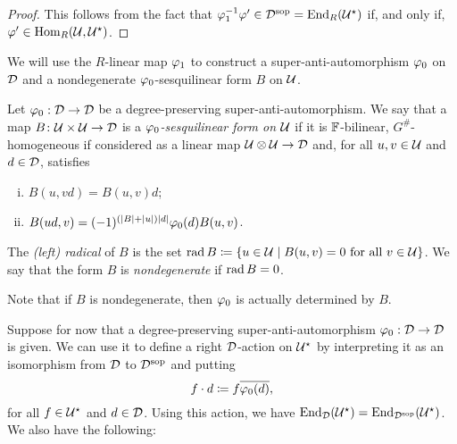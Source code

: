 \begin{proof}
    This follows from the fact that $ \varphi_1^{-1} \varphi' \in  \mathcal{D}^{\mathrm{sop}} = \operatorname{End}_R(\mathcal U^\star)$ if, and only if, $\varphi' \in \operatorname{Hom}_R(\mathcal U, \mathcal U^\star)$.
\end{proof}


We will use 
the $R$-linear map 
$\varphi_1$ to construct a super-anti-automorphism $\varphi_0$ on $\mathcal{D}$ and a nondegenerate $\varphi_0$-sesquilinear form $B$ on $\mathcal U$. 

\begin{defi}\label{def:sesquilinear-form}
    Let $\varphi_0: \mathcal{D} \to \mathcal{D}$ be a degree-preserving su\-per\--an\-ti\--auto\-mor\-phism. We say that a map $B\colon \mathcal U \times \mathcal U \to \mathcal{D}$ is a \emph{$\varphi_0$-sesquilinear form on $\mathcal U$} if it is $\mathbb{F}$-bilinear, $G^\#$-homogeneous if considered as a linear map $\mathcal U\otimes \mathcal U \to \mathcal{D}$ and, for all $u,v \in \mathcal U$ and $d\in \mathcal{D}$, satisfies
    \begin{enumerate}[(i)]
        \item $B(u,vd) = B(u,v)d$; \label{enum:linear-on-the-second}
        \item $B(ud, v) = (-1)^ {(|B| + |u|)|d|}\varphi_0(d) B(u, v)$. \label{enum:vphi0-linear-on-the-first}
    \end{enumerate}
    
    The \emph{(left) radical} of $B$ is the set $\operatorname{rad} B \coloneqq \{u\in \mathcal U \mid B(u, v) = 0 \text{ for all } v\in \mathcal U\}$. We say that the form $B$ is \emph{nondegenerate} if $\operatorname{rad} B = 0$.
\end{defi}

\begin{remark}
    Note that if $B$ is nondegenerate, then $\varphi_0$ is actually determined by $B$.
\end{remark}

Suppose for now that a degree-preserving su\-per\--an\-ti\--auto\-mor\-phism $\varphi_0: \mathcal{D} \to \mathcal{D}$ is given. 
We can use it to define a right $\mathcal{D}$-action on $\mathcal U^\star$ by interpreting it as an isomorphism from $\mathcal{D}$ to $\mathcal{D}^{\mathrm{sop}}$ and putting 
%
\begin{equation}\label{eq:right-D-action}
    f\cdot d \coloneqq f \overline{\varphi_0(d)},
\end{equation}
%
for all $f \in \mathcal U^\star$ and $d\in \mathcal{D}$. 
Using this action, we have $\operatorname{End}_{\mathcal{D}} (\mathcal U^\star) = \operatorname{End}_{\mathcal{D}^{\mathrm{sop}}} (\mathcal U^\star)$. We also have the following:

